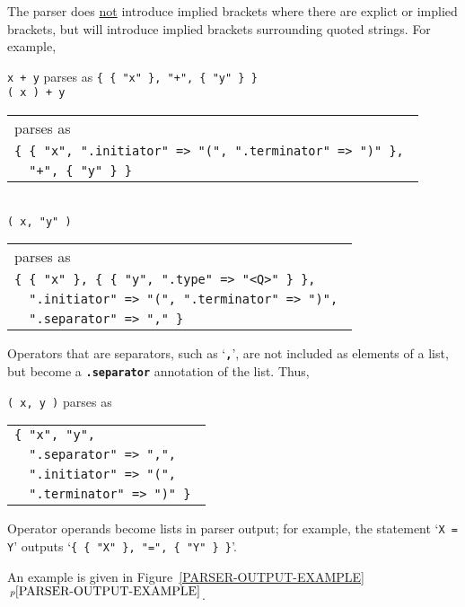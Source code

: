 \documentclass[12pt]{article}
\newcommand{\TT}[1]{{\tt \bfseries #1}}
\newcommand{\ttkey}[1]{{\tt \bfseries #1}}
\newcommand{\pagnote}[1]{$\,^{p\pageref{#1}}$}
\newenvironment{indpar}[1][0.3in]%
	{\begin{list}{}%
		     {\setlength{\itemsep}{0in}%
		      \setlength{\topsep}{0in}%
		      \setlength{\parsep}{1ex}%
		      \setlength{\labelwidth}{#1}%
		      \setlength{\leftmargin}{#1}%
		      \addtolength{\leftmargin}{\labelsep}}%
	 \item}%
	{\end{list}}
\begin{document}
The parser does \underline{not} introduce implied brackets where there
are explict or implied brackets, but will introduce implied brackets
surrounding quoted strings.  For example,
\begin{indpar}
{\tt x + y} parses as {\tt \{ \{ "x" \}, "+", \{ "y" \} \}} \\
{\tt ( x ) + y} \begin{tabular}[t]{@{}l@{}}
		parses as \\
                \tt \{ \{ "x", ".initiator" => "(", ".terminator" => ")" \}, \\
		\tt ~~"+", \{ "y" \} \} \\
                \end{tabular} \\
{\tt ( x, "y" )} \begin{tabular}[t]{@{}l@{}}
		parses as \\
                \tt \{ \{ "x" \}, \{ \{ "y", ".type" => "<Q>" \} \}, \\
		\tt ~~".initiator" => "(", ".terminator" => ")", \\
		\tt ~~".separator" => "," \} \\
                \end{tabular}
\end{indpar}

Operators that are separators, such as `\TT{,}', are not included as elements
of a list, but become a \ttkey{.separator} annotation of the list.  Thus,
\begin{indpar}
{\tt ( x, y )} parses as \begin{tabular}[t]{@{}l@{}}
                \tt \{ "x", "y", \\
		\tt ~~".separator" => ",", \\
		\tt ~~".initiator" => "(", \\
		\tt ~~".terminator" => ")" \} \\
                \end{tabular}
\end{indpar}

Operator operands become lists in parser output;
for example, the statement `{\tt X = Y}' outputs
`{\tt \{ \{ "X" \}, "=", \{ "Y" \} \}}'.

An example is given in Figure~\ref{PARSER-OUTPUT-EXAMPLE}%
\pagnote{PARSER-OUTPUT-EXAMPLE}.
\end{document}
